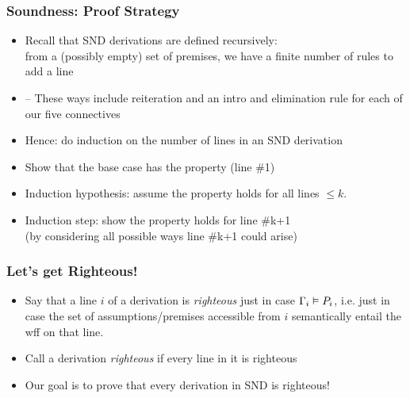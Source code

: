 \begin{frame}
\frametitle{Soundness: Proof Strategy}

\begin{itemize}[<+->]

\item Recall that SND derivations are defined recursively: \\ from a (possibly empty) set of premises, we have a finite number of rules to add a line 

\item[] -- These ways include reiteration and an intro and elimination rule for each of our five connectives

\item Hence: do induction on the number of lines in an SND derivation

\item Show that the base case has the property (line \#1)

\item Induction hypothesis: assume the property holds for all lines $\leq k$. 

\item Induction step: show the property holds for line \#k+1 \\ (by considering all possible ways line \#k+1 could arise)

\end{itemize}
\end{frame}

\begin{frame}
\frametitle{Let's get Righteous!}

\begin{itemize}[<+->]

\item Say that a line $i$ of a derivation is \emph{righteous} just in case $\Gamma_i \vDash P_i$, i.e. just in case the set of assumptions/premises accessible from $i$ semantically entail the wff on that line. 

\item Call a derivation \textit{righteous} if every line in it is righteous

\item Our goal is to prove that every derivation in SND is righteous!





\end{itemize}
\end{frame}

